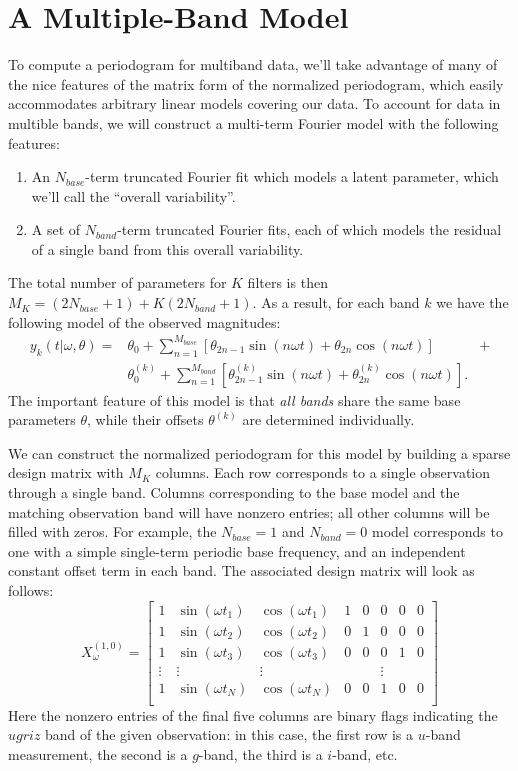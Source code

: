 \documentclass[12pt,preprint]{aastex}
\newcommand{\sectlabel}[1]{\label{sect:#1}}
\begin{document}
\section{A Multiple-Band Model}
\sectlabel{multiband}
To compute a periodogram for multiband data, we'll take advantage of many of the nice features of the matrix form of the normalized periodogram, which easily accommodates arbitrary linear models covering our data.
To account for data in multible bands, we will construct a multi-term Fourier model with the following features:
\begin{enumerate}
  \item An $N_{base}$-term truncated Fourier fit which models a latent parameter, which we'll call the ``overall variability''.
  \item A set of $N_{band}$-term truncated Fourier fits, each of which models the residual of a single band from this overall variability.
\end{enumerate}
The total number of parameters for $K$ filters is then $M_K = (2N_{base} + 1) + K(2N_{band} + 1)$. As a result, for each band $k$ we have the following model of the observed magnitudes:
\begin{eqnarray}
  y_k(t|\omega,\theta) = &\theta_0 + \sum_{n=1}^{M_{base}} \left[\theta_{2n - 1}\sin(n\omega t) + \theta_{2n}\cos(n\omega t)\right]& +\\ 
  &\theta^{(k)}_0 + \sum_{n=1}^{M_{band}} \left[\theta^{(k)}_{2n - 1}\sin(n\omega t) + \theta^{(k)}_{2n}\cos(n\omega t)\right].&
\end{eqnarray}
The important feature of this model is that {\it all bands} share the same base parameters $\theta$, while their offsets $\theta^{(k)}$ are determined individually.

We can construct the normalized periodogram for this model by building a sparse design matrix with $M_K$ columns. Each row corresponds to a single observation through a single band. Columns corresponding to the base model and the matching observation band will have nonzero entries; all other columns will be filled with zeros. For example, the $N_{base}=1$ and $N_{band}=0$ model corresponds to one with a simple single-term periodic base frequency, and an independent constant offset term in each band. The associated design matrix will look as follows:
\begin{equation}
X_\omega^{(1,0)} = \left[
\begin{array}{cccccccc}
1 & \sin(\omega t_1) & \cos(\omega t_1) & 1 & 0 & 0 & 0 & 0\\
1 & \sin(\omega t_2) & \cos(\omega t_2) & 0 & 1 & 0 & 0 & 0\\
1 & \sin(\omega t_3) & \cos(\omega t_3) & 0 & 0 & 0 & 1 & 0\\
\vdots & \vdots & \vdots & & & \vdots & &\\
1 & \sin(\omega t_N) & \cos(\omega t_N) & 0 & 0 & 1 & 0 & 0\\
\end{array}
\right]
\end{equation}
Here the nonzero entries of the final five columns are binary flags indicating the $ugriz$ band of the given observation: in this case, the first row is a $u$-band measurement, the second is a $g$-band, the third is a $i$-band, etc.
\end{document}
